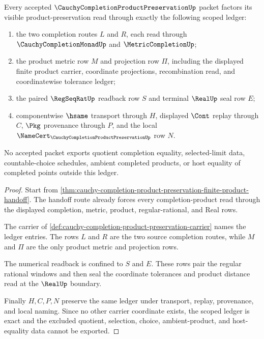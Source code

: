 \begin{theorem}
\label{thm:cauchy-completion-product-preservation-scope-ledger}
Every accepted $\CauchyCompletionProductPreservationUp$ packet factors its visible product-preservation read through exactly the following scoped ledger:
\begin{enumerate}
\item the two completion routes $L$ and $R$, each read through $\CauchyCompletionMonadUp$ and $\MetricCompletionUp$;
\item the product metric row $M$ and projection row $\Pi$, including the displayed finite product carrier, coordinate projections, recombination read, and coordinatewise tolerance ledger;
\item the paired $\RegSeqRatUp$ readback row $S$ and terminal $\RealUp$ seal row $E$;
\item componentwise $\hsame$ transport through $H$, displayed $\Cont$ replay through $C$, $\Pkg$ provenance through $P$, and the local $\NameCert_{\CauchyCompletionProductPreservationUp}$ row $N$.
\end{enumerate}
No accepted packet exports quotient completion equality, selected-limit data, countable-choice schedules, ambient completed products, or host equality of completed points outside this ledger.
\end{theorem}
\begin{proof}
Start from \autoref{thm:cauchy-completion-product-preservation-finite-product-handoff}. The handoff route already forces every completion-product read through the displayed completion, metric, product, regular-rational, and Real rows.

The carrier of \autoref{def:cauchy-completion-product-preservation-carrier} names the ledger entries. The rows $L$ and $R$ are the two source completion routes, while $M$ and $\Pi$ are the only product metric and projection rows.

The numerical readback is confined to $S$ and $E$. These rows pair the regular rational windows and then seal the coordinate tolerances and product distance read at the $\RealUp$ boundary.

Finally $H,C,P,N$ preserve the same ledger under transport, replay, provenance, and local naming. Since no other carrier coordinate exists, the scoped ledger is exact and the excluded quotient, selection, choice, ambient-product, and host-equality data cannot be exported.
\end{proof}

